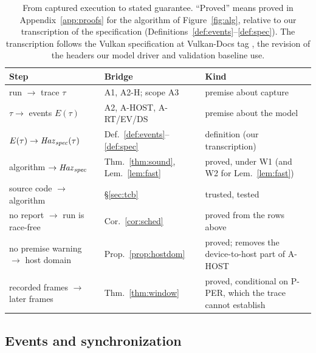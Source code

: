 \begin{table}[t]
\caption{From captured execution to stated guarantee. ``Proved'' means proved in Appendix~\ref{app:proofs} for the
algorithm of Figure~\ref{fig:alg}, relative to our transcription of the specification
(Definitions~\ref{def:events}--\ref{def:spec}). The transcription follows the Vulkan specification at Vulkan-Docs
tag , the revision of the headers our model driver and validation baseline use.}
\label{tab:chain}
\small
\begin{tabular}{@{}p{}p{}p{}@{}}
\toprule
Step & Bridge & Kind \\
\midrule
run $\to$ trace $\tau$ & A1, A2-H; scope A3 & premise about capture \\
$\tau \to$ events $E(\tau)$ & A2, A-HOST, A-RT/EV/DS & premise about the model \\
$E(\tau) \to \mathit{Haz}_{\mathit{spec}}(\tau)$ & Def.~\ref{def:events}--\ref{def:spec} & definition (our transcription) \\
algorithm $\to \mathit{Haz}_{\mathit{spec}}$ & Thm.~\ref{thm:sound}, Lem.~\ref{lem:fast} & proved, under W1 (and W2 for Lem.~\ref{lem:fast}) \\
source code $\to$ algorithm & \S\ref{sec:tcb} & trusted, tested \\
no report $\to$ run is race-free & Cor.~\ref{cor:sched} & proved from the rows above \\
no premise warning $\to$ host domain & Prop.~\ref{prop:hostdom} & proved; removes the device-to-host part of A-HOST \\
recorded frames $\to$ later frames & Thm.~\ref{thm:window} & proved, conditional on P-PER, which the trace cannot establish \\
\bottomrule
\end{tabular}
\end{table}

\subsection{Events and synchronization}
\label{sec:events}

